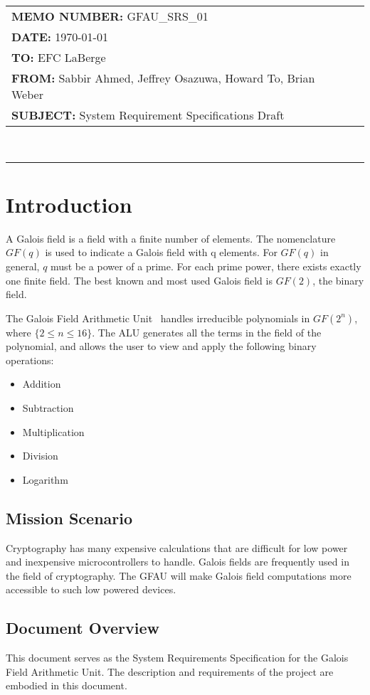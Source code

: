 \documentclass[paper=usletter, fontsize=12pt]{article}
\newcommand{\team}{Galois Field Arithmetic Unit}
\newcommand{\Sabbir}{Sabbir Ahmed}
\newcommand{\Jeffrey}{Jeffrey Osazuwa}
\newcommand{\Howard}{Howard To}
\newcommand{\Brian}{Brian Weber}
\newcommand{\documentinfo}[5]{
    \begin{centering}
        \parbox{2in}{
        \begin{spacing}{1}
            \begin{flushleft}
                \begin{tabular}{l l}
                    #1 \\
                    #2 \\
                    #3 \\
                    #4 \\
                    #5 \\
                \end{tabular}\\
                \rule{\textwidth}{1pt}
            \end{flushleft}
        \end{spacing}
        }
    \end{centering}
}
\begin{document}
    \documentinfo
    {\textbf{MEMO NUMBER:} GFAU\_SRS\_01}
    {\textbf{DATE:} \today}
    {\textbf{TO: } EFC LaBerge}
    {\textbf{FROM: }\Sabbir, \Jeffrey, \Howard, \Brian}
    {\textbf{SUBJECT: } System Requirement Specifications Draft}
    \vspace{-0.1in}

    \section{Introduction}
    A Galois field is a field with a finite number of elements. The nomenclature $GF(q)$ is used to indicate a Galois field with q elements. For $GF(q)$ in general, $q$ must be a power of a prime. For each prime power, there exists exactly one finite field. The best known and most used Galois field is $GF(2)$, the binary field.

    The \team~ handles irreducible polynomials in $GF(2^n)$, where $\{2 \leq n \leq 16\}$. The ALU generates all the terms in the field of the polynomial, and allows the user to view and apply the following binary operations:

    \begin{itemize}

        \item Addition
        \item Subtraction
        \item Multiplication
        \item Division
        \item Logarithm

    \end{itemize}

        \subsection{Mission Scenario}
        Cryptography has many expensive calculations that are difficult for low power and inexpensive microcontrollers to handle. Galois fields are frequently used in the field of cryptography. The GFAU will make Galois field computations more accessible to such low powered devices.

        \subsection{Document Overview}
        This document serves as the System Requirements Specification for the Galois Field Arithmetic Unit. The description and requirements of the project are embodied in this document.
\end{document}
